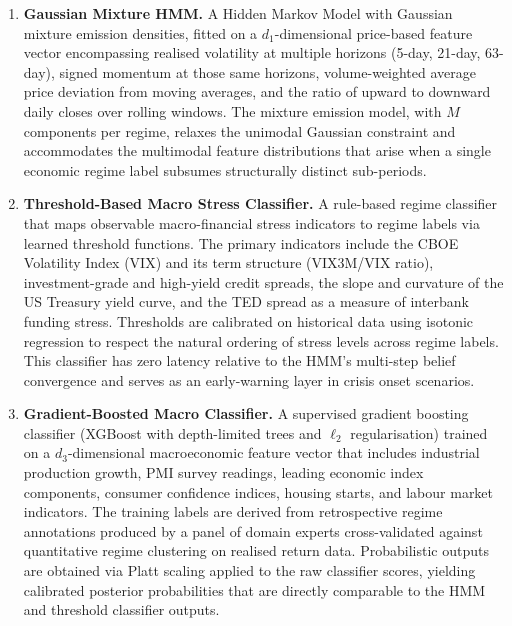 \documentclass[12pt,openany]{book}
\numberwithin{equation}{chapter}
\theoremstyle{plain}
\theoremstyle{definition}
\theoremstyle{remark}
\begin{document}
\begin{enumerate}
    \item \textbf{Gaussian Mixture HMM.} A Hidden Markov Model with Gaussian mixture emission densities, fitted on a $d_1$-dimensional price-based feature vector encompassing realised volatility at multiple horizons (5-day, 21-day, 63-day), signed momentum at those same horizons, volume-weighted average price deviation from moving averages, and the ratio of upward to downward daily closes over rolling windows. The mixture emission model, with $M$ components per regime, relaxes the unimodal Gaussian constraint and accommodates the multimodal feature distributions that arise when a single economic regime label subsumes structurally distinct sub-periods.

    \item \textbf{Threshold-Based Macro Stress Classifier.} A rule-based regime classifier that maps observable macro-financial stress indicators to regime labels via learned threshold functions. The primary indicators include the CBOE Volatility Index (VIX) and its term structure (VIX3M/VIX ratio), investment-grade and high-yield credit spreads, the slope and curvature of the US Treasury yield curve, and the TED spread as a measure of interbank funding stress. Thresholds are calibrated on historical data using isotonic regression to respect the natural ordering of stress levels across regime labels. This classifier has zero latency relative to the HMM's multi-step belief convergence and serves as an early-warning layer in crisis onset scenarios.

    \item \textbf{Gradient-Boosted Macro Classifier.} A supervised gradient boosting classifier (XGBoost with depth-limited trees and $\ell_2$ regularisation) trained on a $d_3$-dimensional macroeconomic feature vector that includes industrial production growth, PMI survey readings, leading economic index components, consumer confidence indices, housing starts, and labour market indicators. The training labels are derived from retrospective regime annotations produced by a panel of domain experts cross-validated against quantitative regime clustering on realised return data. Probabilistic outputs are obtained via Platt scaling applied to the raw classifier scores, yielding calibrated posterior probabilities that are directly comparable to the HMM and threshold classifier outputs.


\end{enumerate}
\end{document}
